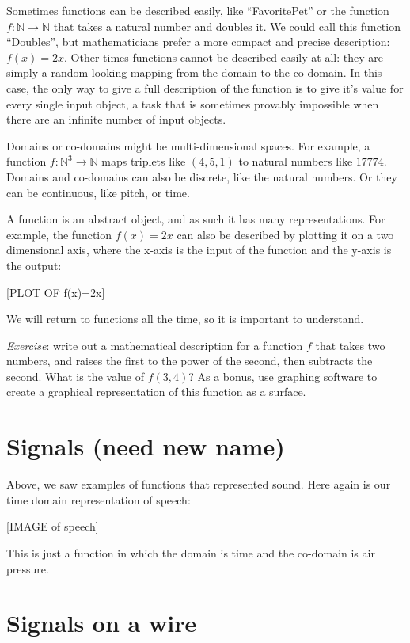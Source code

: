 \documentclass[UTF8]{book}
\begin{document}
\begin{CJK}{UTF8}{gbsn}
Sometimes functions can be described easily, like ``FavoritePet'' or the function $f: \mathbb{N} \rightarrow \mathbb{N}$ that takes a natural number and doubles it. We could call this function ``Doubles'', but mathematicians prefer a more compact and precise description: $f(x) = 2x$. Other times functions cannot be described easily at all: they are simply a random looking mapping from the domain to the co-domain. In this case, the only way to give a full description of the function is to give it's value for every single input object, a task that is sometimes provably impossible when there are an infinite number of input objects.

Domains or co-domains might be multi-dimensional spaces. For example, a function $f: \mathbb{N}^{3} \rightarrow \mathbb{N}$ maps triplets like $(4,5,1)$ to natural numbers like $17774$. Domains and co-domains can also be discrete, like the natural numbers. Or they can be continuous, like pitch, or time.

A function is an abstract object, and as such it has many representations. For example, the function $f(x)=2x$ can also be described by plotting it on a two dimensional axis, where the x-axis is the input of the function and the y-axis is the output:

[PLOT OF f(x)=2x]

We will return to functions all the time, so it is important to understand.

\emph{Exercise}: write out a mathematical description for a function $f$ that takes two numbers, and raises the first to the power of the second, then subtracts the second. What is the value of $f(3,4)$? As a bonus, use graphing software to create a graphical representation of this function as a surface.

\section{Signals (need new name)}

Above, we saw examples of functions that represented sound. Here again is our time domain representation of speech:

[IMAGE of speech]

This is just a function in which the domain is time and the co-domain is air pressure.







\section{Signals on a wire}





\end{CJK}
\end{document}

